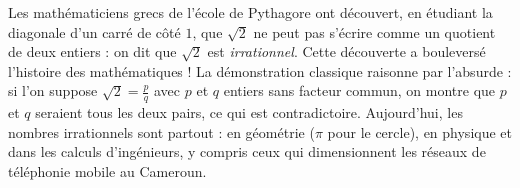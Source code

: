 \documentclass[11pt]{article}
\begin{document}
\begin{savaistu}
Les mathématiciens grecs de l'école de Pythagore ont découvert, en étudiant la diagonale d'un carré de côté $1$, que $\sqrt{2}$ ne peut pas s'écrire comme un quotient de deux entiers : on dit que $\sqrt{2}$ est \emph{irrationnel}. Cette découverte a bouleversé l'histoire des mathématiques ! La démonstration classique raisonne par l'absurde : si l'on suppose $\sqrt{2} = \frac{p}{q}$ avec $p$ et $q$ entiers sans facteur commun, on montre que $p$ et $q$ seraient tous les deux pairs, ce qui est contradictoire. Aujourd'hui, les nombres irrationnels sont partout : en géométrie ($\pi$ pour le cercle), en physique et dans les calculs d'ingénieurs, y compris ceux qui dimensionnent les réseaux de téléphonie mobile au Cameroun.
\end{savaistu}
\end{document}
